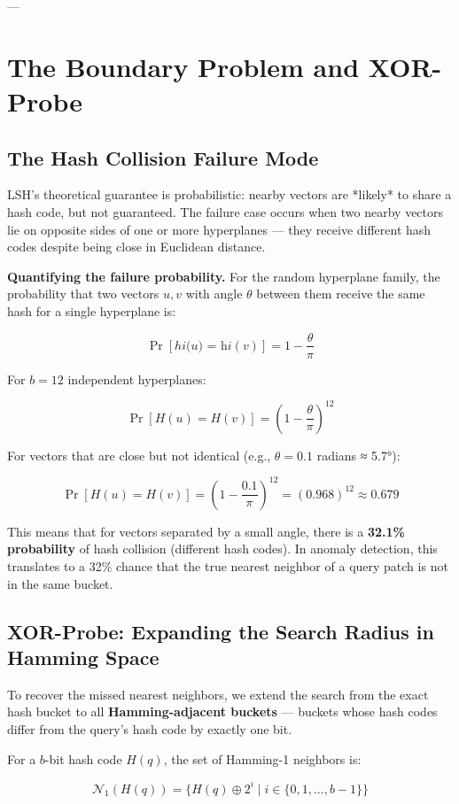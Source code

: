 \documentclass[12pt,a4paper,oneside]{report}
\begin{document}
---

\section{The Boundary Problem and XOR-Probe}

\subsection{The Hash Collision Failure Mode}

LSH's theoretical guarantee is probabilistic: nearby vectors are *likely* to share a hash code, but not guaranteed. The failure case occurs when two nearby vectors lie on opposite sides of one or more hyperplanes --- they receive different hash codes despite being close in Euclidean distance.

\textbf{Quantifying the failure probability.} For the random hyperplane family, the probability that two vectors $u, v$ with angle $\theta$ between them receive the same hash for a single hyperplane is:

$$\Pr[h\textit{i(u) = h}i(v)] = 1 - \frac{\theta}{\pi}$$

For $b = 12$ independent hyperplanes:

$$\Pr[H(u) = H(v)] = \left(1 - \frac{\theta}{\pi}\right)^{12}$$

For vectors that are close but not identical (e.g., $\theta = 0.1$ radians ≈ 5.7°):

$$\Pr[H(u) = H(v)] = \left(1 - \frac{0.1}{\pi}\right)^{12} = (0.968)^{12} \approx 0.679$$

This means that for vectors separated by a small angle, there is a \textbf{32.1\% probability} of hash collision (different hash codes). In anomaly detection, this translates to a 32\% chance that the true nearest neighbor of a query patch is not in the same bucket.

\subsection{XOR-Probe: Expanding the Search Radius in Hamming Space}

To recover the missed nearest neighbors, we extend the search from the exact hash bucket to all \textbf{Hamming-adjacent buckets} --- buckets whose hash codes differ from the query's hash code by exactly one bit.

For a $b$-bit hash code $H(q)$, the set of Hamming-1 neighbors is:

$$\mathcal{N}_1(H(q)) = \{H(q) \oplus 2^i \mid i \in \{0, 1, \ldots, b-1\}\}$$
\end{document}

